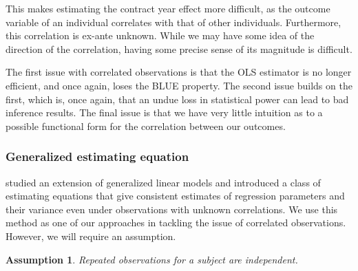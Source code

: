 \documentclass[12pt]{article}
\newtheorem{assumption}{Assumption}
\begin{document}
	This makes estimating the contract year effect more difficult, as the outcome variable of an individual correlates with that of other individuals. Furthermore, this correlation is ex-ante unknown. While we may have some idea of the direction of the correlation, having some precise sense of its magnitude is difficult.
	
	The first issue with correlated observations is that the OLS estimator is no longer efficient, and once again, loses the BLUE property. The second issue builds on the first, which is, once again, that an undue loss in statistical power can lead to bad inference results. The final issue is that we have very little intuition as to a possible functional form for the correlation between our outcomes.
	
	\subsubsection{Generalized estimating equation}
	
	\cite{liang_longitudinal_1986} studied an extension of generalized linear models and introduced a class of estimating equations that give consistent estimates of regression parameters and their variance even under observations with unknown correlations. We use this method as one of our approaches in tackling the issue of correlated observations. However, we will require an assumption.
	
	\begin{assumption}
		Repeated observations for a subject are independent.
	\end{assumption}
	
\end{document}
